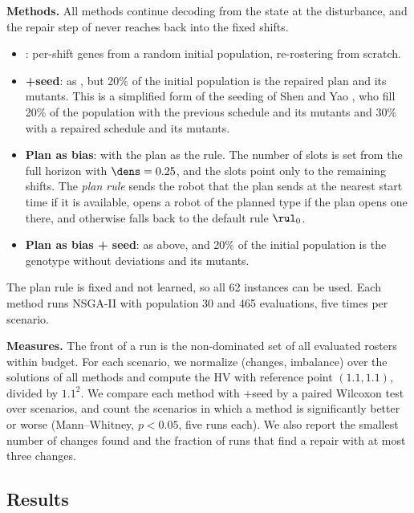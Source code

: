 \textbf{Methods.}
All methods continue decoding from the state at the disturbance, and the repair step of  never reaches back into the fixed shifts.
\begin{itemize}
  \item \textbf{}: per-shift genes from a random initial population, \ie re-rostering from scratch.
  \item \textbf{+seed}: as , but 20\% of the initial population is the repaired plan and its mutants.
  This is a simplified form of the seeding of Shen and Yao \cite{shen2015dfjsp}, who fill 20\% of the population with the previous schedule and its mutants and 30\% with a repaired schedule and its mutants.
  \item \textbf{Plan as bias}: \SDD with the plan as the rule. The number of slots is set from the full horizon with $\dens = 0.25$, and the slots point only to the remaining shifts.
  The \emph{plan rule} sends the robot that the plan sends at the nearest start time if it is available,
  opens a robot of the planned type if the plan opens one there,
  and otherwise falls back to the default rule $\rul_0$.
  \item \textbf{Plan as bias + seed}: as above, and 20\% of the initial population is the genotype without deviations and its mutants.
\end{itemize}
The plan rule is fixed and not learned, so all 62 instances can be used.
Each method runs NSGA-II with population 30 and 465 evaluations, five times per scenario.

\textbf{Measures.}
The front of a run is the non-dominated set of all evaluated rosters within budget.
For each scenario, we normalize (changes, imbalance) over the solutions of all methods and compute the HV with reference point $(1.1, 1.1)$, divided by $1.1^2$.
We compare each method with +seed by a paired Wilcoxon test over scenarios,
and count the scenarios in which a method is significantly better or worse (Mann--Whitney, $p < 0.05$, five runs each).
We also report the smallest number of changes found and the fraction of runs that find a repair with at most three changes.

\subsection{Results}
\label{sec:exp-rerostering:results}

